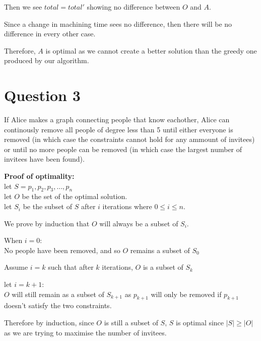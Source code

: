 \documentclass{article}
\begin{document}
Then we see $total = total'$ showing no difference between $O$ and $A$.

Since a change in machining time sees no difference, then there will be no difference in every other case.

Therefore, $A$ is optimal as we cannot create a better solution than the greedy one produced by our algorithm.

\section*{Question 3}
If Alice makes a graph connecting people that know eachother, Alice can continously remove all people of degree less than 5 until either everyone is removed (in which case the constraints cannot hold for any ammount of invitees) or until no more people can be removed (in which case the largest number of invitees have been found).

\textbf{Proof of optimality:}\\
let $S = {p_1, p_2, p_3, \ldots, p_n}$\\
let $O$ be the set of the optimal solution.\\
let $S_i$ be the subset of $S$ after $i$ iterations where $0 \leq i \leq n$.

We prove by induction that $O$ will always be a subset of $S_i$.

When $i = 0$:\\
No people have been removed, and so $O$ remains a subset of $S_0$

Assume $i = k$ such that after $k$ iterations, $O$ is a subset of $S_k$

let $i = k + 1$:\\
$O$ will still remain as a subset of $S_{k+1}$ as $p_{k+1}$ will only be removed if $p_{k+1}$ doesn't satisfy the two constraints.

Therefore by induction, since $O$ is still a subset of $S$, $S$ is optimal since $|S| \geq |O|$ as we are trying to maximise the number of invitees.
\end{document}
